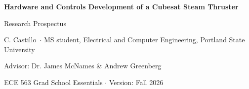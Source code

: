\documentclass[11pt]{article}
\newcommand{\prospectustitle}{Hardware and Controls Development of a Cubesat Steam Thruster}
\newcommand{\studentname}{C. Castillo}
\newcommand{\degree}{MS student}    %
\newcommand{\advisorname}{Dr. James McNames \& Andrew Greenberg}
\begin{document}
\begin{center}
  {\Large\bfseries \prospectustitle\par}
  \vspace{0.6em}
  {\large Research Prospectus\par}
  \vspace{0.8em}
  \studentname\ $\cdot$ \degree, Electrical and Computer Engineering,
  Portland State University\par
  Advisor: \advisorname\par
  ECE 563 Grad School Essentials $\cdot$ Version: Fall 2026\par
\end{center}





\appendix
\end{document}
